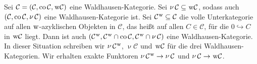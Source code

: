 \begin{definition}
	Sei $\mathcal{C}=\enbrace*{\mathcal{C}, \co \mathcal{C}, \w \mathcal{C}}$ eine Waldhausen-Kategorie.
	Sei $\mathop{\nu} \mathcal{C} \subseteq \w \mathcal{C}$, sodass auch $\enbrace*{\mathcal{C}, \co \mathcal{C}, \mathop{\nu} \mathcal{C}}$ eine Waldhausen-Kategorie ist.
	Sei $\mathcal{C}^{\w} \subseteq \mathcal{C}$ die volle Unterkategorie auf allen $\w$-azyklischen Objekten in $\mathcal{C}$, das heißt auf allen $C \in \mathcal{C}$, für die $0 \hookrightarrow C$ in $\w \mathcal{C}$ liegt.
	Dann ist auch $\enbrace*{\mathcal{C}^{\w}, \mathcal{C}^{\w} \cap \co \mathcal{C}, \mathcal{C}^{\w} \cap \mathop{\nu}\mathcal{C}}$ eine Waldhausen-Kategorie.
	In dieser Situation schreiben wir $\mathop{\nu} \mathcal{C}^{\w}$, $\mathop{\nu}\mathcal{C}$ und $\w \mathcal{C}$ für die drei Waldhausen-Kategorien.
	Wir erhalten exakte Funktoren $\mathop{\nu} \mathcal{C}^{\w} \to \mathop{\nu} \mathcal{C}$ und $\mathop{\nu} \mathcal{C} \to \w \mathcal{C}$.
\end{definition}

